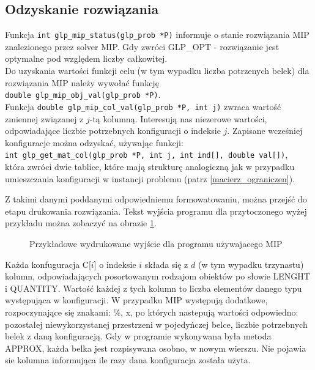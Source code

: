 \subsection{Odzyskanie rozwiązania}
Funkcja \verb|int glp_mip_status(glp_prob *P)| informuje o stanie rozwiązania MIP znalezionego przez solver MIP. Gdy zwróci GLP\_OPT - rozwiązanie jest optymalne pod względem liczby całkowitej. \\
Do uzyskania wartości funkcji celu (w tym wypadku liczba potrzenych belek) dla rozwiązania MIP należy wywołać funkcję \\ 
\verb|double glp_mip_obj_val(glp_prob *P)|. \\
Funkcja \verb|double glp_mip_col_val(glp_prob *P, int j)| zwraca wartość zmiennej związanej z $j$-tą kolumną. Interesują nas niezerowe wartości, odpowiadające liczbie potrzebnych konfiguracji o indeksie $j$. Zapisane wcześniej konfiguracje można odzyskać, używając funkcji: \\
\verb|int glp_get_mat_col(glp_prob *P, int j, int ind[], double val[])|, \\
która zwróci dwie tablice, które mają strukturę analogiczną jak w przypadku umieszczania konfiguracji w instancji problemu (patrz \ref{macierz_ograniczen}). 

Z takimi danymi poddanymi odpowiedniemu formowatowaniu, można przejść do etapu drukowania rozwiązania. Tekst wyjścia programu dla przytoczonego wyżej przykładu można zobaczyć na obrazie \ref{output_example}.

\begin{figure}[h!]
	
	\caption{Przykładowe wydrukowane wyjście dla programu używajacego MIP}
	\label{output_example}
\end{figure}

Każda konfuguracja C[$i$] o indeksie $i$ składa się z $d$ (w tym wypadku trzynastu) kolumn, odpowiadających posortowanym rodzajom obiektów po słowie LENGHT i QUANTITY. Wartość każdej z tych kolumn to liczba elementów danego typu występująca w konfiguracji. 
W przypadku MIP występują dodatkowe, rozpoczynające się znakami: $\%$, x, po których nastepują wartości odpowiedno: pozostałej niewykorzystanej przestrzeni w pojedyńczej belce, liczbie potrzebnych belek z daną konfiguracją.
Gdy w programie wykonywana była metoda APPROX, każda belka jest rozpisywana osobno, w nowym wierszu. Nie pojawia sie kolumna informująca ile razy dana konfiguracja została użyta. 







